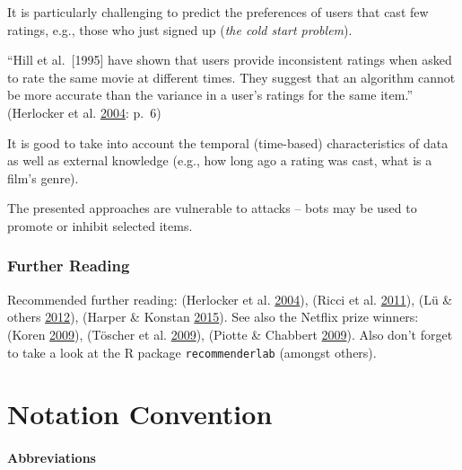 \documentclass[10pt,b5paper,krantz1]{krantz}
\renewenvironment{quote}{\begin{VF}}{\end{VF}}
\begin{document}
It is particularly challenging to predict the preferences of users
that cast few ratings, e.g., those who just signed up (\emph{the cold start problem}).

\begin{quote}
``Hill et al.~{[}1995{]} have shown that users provide inconsistent ratings when asked to rate the same movie at different times. They suggest that an algorithm cannot be more accurate than the variance in a user's ratings for the same item.'' (Herlocker et al. \protect\hyperlink{ref-herlocker_etal}{2004}: p.~6)
\end{quote}

It is good to take into account the temporal (time-based) characteristics of data
as well as external knowledge
(e.g., how long ago a rating was cast,
what is a film's genre).

The presented approaches are vulnerable to attacks -- bots may be used
to promote or inhibit selected items.

\hypertarget{further-reading-8}{%
\subsection{Further Reading}\label{further-reading-8}}

Recommended further reading:
(Herlocker et al. \protect\hyperlink{ref-herlocker_etal}{2004}),
(Ricci et al. \protect\hyperlink{ref-ricci_etal}{2011}),
(Lü \& others \protect\hyperlink{ref-lu_etal}{2012}),
(Harper \& Konstan \protect\hyperlink{ref-movielens}{2015}).
See also the Netflix prize winners: (Koren \protect\hyperlink{ref-bellkor_netflix}{2009}),
(Töscher et al. \protect\hyperlink{ref-bigchaos_netflix}{2009}),
(Piotte \& Chabbert \protect\hyperlink{ref-pragmatictheory_netflix}{2009}).
Also don't forget to take a look at
the R package \texttt{recommenderlab} (amongst others).

\hypertarget{appendix-appendix}{%
\appendix {}}


\hypertarget{notation-convention}{%
\chapter{Notation Convention}\label{notation-convention}}

\hypertarget{abbreviations}{%
\subsubsection*{Abbreviations}\label{abbreviations}}
\end{document}
